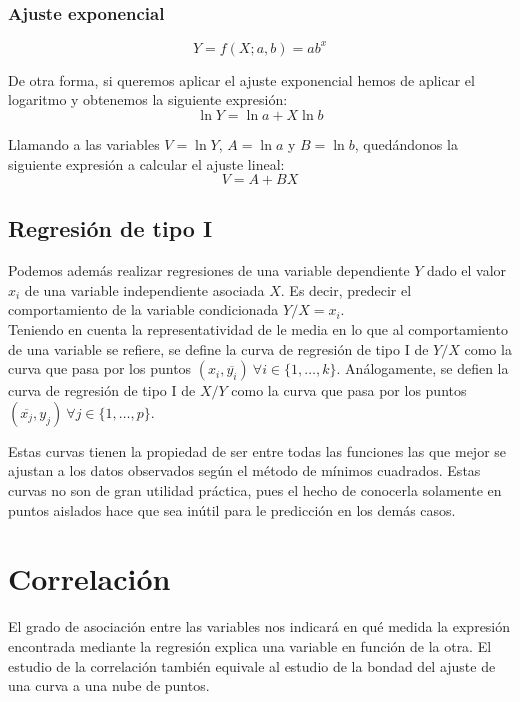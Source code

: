 \subsubsection{Ajuste exponencial}\vspace{-0.5cm}
\begin{equation*}
    Y=f(X;a,b) = ab^{x}
\end{equation*}

De otra forma, si queremos aplicar el ajuste exponencial hemos de aplicar el logaritmo y obtenemos la siguiente expresión:
$$\ln Y = \ln a + X \ln b$$

Llamando a las variables $V = \ln Y$, $A = \ln a$ y $B = \ln b$, quedándonos la siguiente expresión a calcular el ajuste lineal: $$V= A + BX$$

\subsection{Regresión de tipo I}

Podemos además realizar regresiones de una variable dependiente $Y$ dado el valor $x_i$ de una variable independiente
asociada $X$. Es decir, predecir el comportamiento de la variable condicionada $Y/X=x_i$.\\


Teniendo en cuenta la representatividad de le media en lo que al comportamiento de una variable se refiere, se define la curva de regresión de tipo I de $Y/X$ como la curva que pasa por los puntos $(x_i, \overline{y_i}) \
    \forall i \in \{1, \ldots, k\}$. Análogamente, se defien la curva de regresión de tipo I de $X/Y$ como la curva
que pasa por los puntos $(\overline{x_j}, y_j) \ \forall j \in \{1, \ldots, p\}$.

Estas curvas tienen la propiedad de ser entre todas las funciones las que mejor se ajustan a los datos observados
según el método de mínimos cuadrados. Estas curvas no son de gran utilidad práctica, pues el hecho de conocerla
solamente en puntos aislados hace que sea inútil para le predicción en los demás casos.

\section{Correlación}

El grado de asociación entre las variables nos indicará en qué medida la expresión encontrada mediante la regresión explica una variable en función de la otra. El estudio de la correlación también equivale al estudio de la bondad del ajuste de una curva a una nube de puntos.

